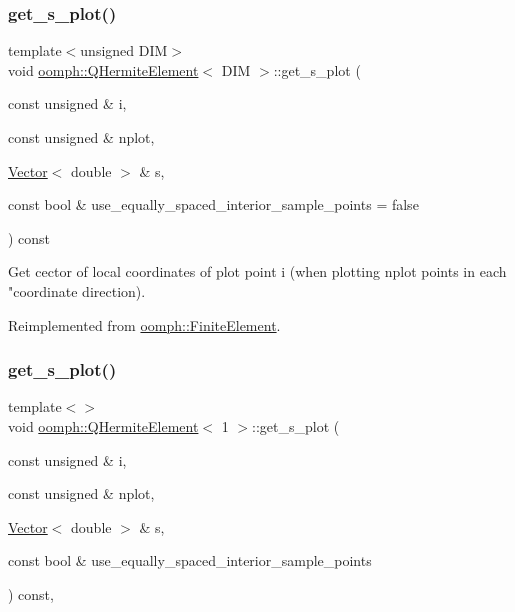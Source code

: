 \subsubsection{\texorpdfstring{get\+\_\+s\+\_\+plot()}{get\_s\_plot()}\hspace{0.1cm}{\footnotesize\ttfamily [1/3]}}
{\footnotesize\ttfamily template$<$unsigned D\+IM$>$ \\
void \hyperlink{classoomph_1_1QHermiteElement}{oomph\+::\+Q\+Hermite\+Element}$<$ D\+IM $>$\+::get\+\_\+s\+\_\+plot (\begin{DoxyParamCaption}\item[{const unsigned \&}]{i,  }\item[{const unsigned \&}]{nplot,  }\item[{\hyperlink{classoomph_1_1Vector}{Vector}$<$ double $>$ \&}]{s,  }\item[{const bool \&}]{use\+\_\+equally\+\_\+spaced\+\_\+interior\+\_\+sample\+\_\+points = {\ttfamily false} }\end{DoxyParamCaption}) const\hspace{0.3cm}{\ttfamily [virtual]}}



Get cector of local coordinates of plot point i (when plotting nplot points in each "coordinate direction). 



Reimplemented from \hyperlink{classoomph_1_1FiniteElement_a82da844fd3ebb2005842464cdc148a03}{oomph\+::\+Finite\+Element}.

\mbox{\label{classoomph_1_1QHermiteElement_a5715822b33881a8d0cba7e6253624c97}} 
\subsubsection{\texorpdfstring{get\+\_\+s\+\_\+plot()}{get\_s\_plot()}\hspace{0.1cm}{\footnotesize\ttfamily [2/3]}}
{\footnotesize\ttfamily template$<$$>$ \\
void \hyperlink{classoomph_1_1QHermiteElement}{oomph\+::\+Q\+Hermite\+Element}$<$ 1 $>$\+::get\+\_\+s\+\_\+plot (\begin{DoxyParamCaption}\item[{const unsigned \&}]{i,  }\item[{const unsigned \&}]{nplot,  }\item[{\hyperlink{classoomph_1_1Vector}{Vector}$<$ double $>$ \&}]{s,  }\item[{const bool \&}]{use\+\_\+equally\+\_\+spaced\+\_\+interior\+\_\+sample\+\_\+points }\end{DoxyParamCaption}) const\hspace{0.3cm}{\ttfamily [inline]}, {\ttfamily [virtual]}}

